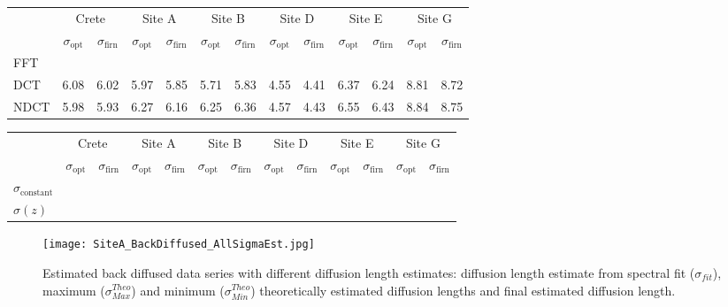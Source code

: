 \documentclass[../../CompleteThesis/Complete_1stDraft]{subfiles}
\begin{document}
	
	
\begin{table}[ht]
	\centering
	\begin{tabular}{l||*{6}{c | c||}}
		&
		\multicolumn{2}{c}{Crete} & \multicolumn{2}{c}{Site A} & \multicolumn{2}{c}{Site B} & \multicolumn{2}{c}{Site D} & \multicolumn{2}{c}{Site E} & \multicolumn{2}{c||}{Site G} \\
		&
		$\sigma_{\text{opt}}$ & $\sigma_{\text{firn}}$ & $\sigma_{\text{opt}}$ & $\sigma_{\text{firn}}$ & $\sigma_{\text{opt}}$ & $\sigma_{\text{firn}}$ & $\sigma_{\text{opt}}$ & $\sigma_{\text{firn}}$ & $\sigma_{\text{opt}}$ & $\sigma_{\text{firn}}$ & $\sigma_{\text{opt}}$ & $\sigma_{\text{firn}}$ \\
		
		\hline
		FFT & & & & & & & & & & & & \\ 
		DCT & 6.08 & 6.02 & 5.97 & 5.85 & 5.71 & 5.83 & 4.55 & 4.41 & 6.37 & 6.24 & 8.81 & 8.72 \\
		NDCT & 5.98 & 5.93 & 6.27 & 6.16 & 6.25 & 6.36 & 4.57 & 4.43 & 6.55 & 6.43 & 8.84 & 8.75 \\
	\end{tabular}
\end{table}

\begin{table}[ht]
	\centering
	\begin{tabular}{l||*{6}{c | c||}}
		&
		\multicolumn{2}{c}{Crete} & \multicolumn{2}{c}{Site A} & \multicolumn{2}{c}{Site B} & \multicolumn{2}{c}{Site D} & \multicolumn{2}{c}{Site E} & \multicolumn{2}{c||}{Site G} \\
		&
		$\sigma_{\text{opt}}$ & $\sigma_{\text{firn}}$ & $\sigma_{\text{opt}}$ & $\sigma_{\text{firn}}$ & $\sigma_{\text{opt}}$ & $\sigma_{\text{firn}}$ & $\sigma_{\text{opt}}$ & $\sigma_{\text{firn}}$ & $\sigma_{\text{opt}}$ & $\sigma_{\text{firn}}$ & $\sigma_{\text{opt}}$ & $\sigma_{\text{firn}}$ \\
		
		\hline
		$\sigma_{\text{constant}}$ & & & & & & & & & & & & \\ 
		$\sigma(z)$ & & & & & & & & & & & & \\ 
	\end{tabular}
\end{table}

\begin{figure}
	\centering
	\texttt{[image: SiteA\_BackDiffused\_AllSigmaEst.jpg]}
	\caption[All diffusion length estimate deconvolutions, Site A]{Estimated back diffused data series with different diffusion length estimates: diffusion length estimate from spectral fit ($\sigma_{fit}$), maximum ($\sigma_{Max}^{Theo}$) and minimum ($\sigma_{Min}^{Theo}$) theoretically estimated diffusion lengths and final estimated diffusion length.}
	\label{fig:SiteA_BackDiffused_AllSigmaEst}
\end{figure}
\end{document}
